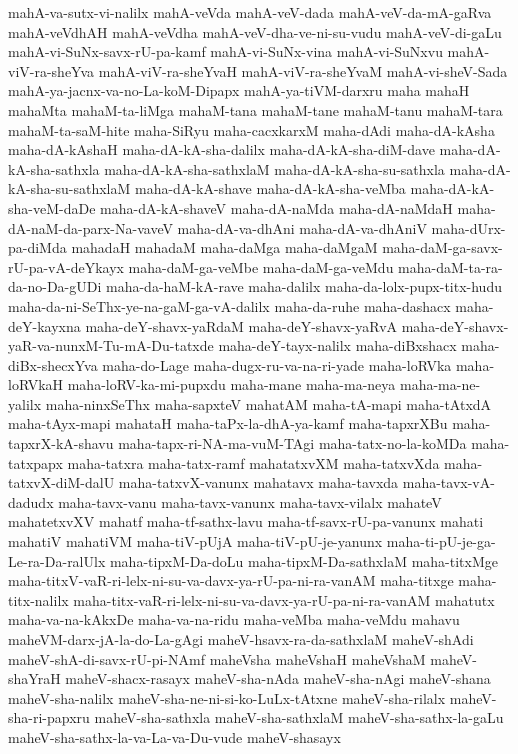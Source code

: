 {mahA-va-sutx-vi-nalilx
mahA-veVda
mahA-veV-dada
mahA-veV-da-mA-gaRva
mahA-veVdhAH
mahA-veVdha
mahA-veV-dha-ve-ni-su-vudu
mahA-veV-di-gaLu
mahA-vi-SuNx-savx-rU-pa-kamf
mahA-vi-SuNx-vina
mahA-vi-SuNxvu
mahA-viV-ra-sheYva
mahA-viV-ra-sheYvaH
mahA-viV-ra-sheYvaM
mahA-vi-sheV-Sada
mahA-ya-jacnx-va-no-La-koM-Dipapx
mahA-ya-tiVM-darxru
maha
mahaH
mahaMta
mahaM-ta-liMga
mahaM-tana
mahaM-tane
mahaM-tanu
mahaM-tara
mahaM-ta-saM-hite
maha-SiRyu
maha-cacxkarxM
maha-dAdi
maha-dA-kAsha
maha-dA-kAshaH
maha-dA-kA-sha-dalilx
maha-dA-kA-sha-diM-dave
maha-dA-kA-sha-sathxla
maha-dA-kA-sha-sathxlaM
maha-dA-kA-sha-su-sathxla
maha-dA-kA-sha-su-sathxlaM
maha-dA-kA-shave
maha-dA-kA-sha-veMba
maha-dA-kA-sha-veM-daDe
maha-dA-kA-shaveV
maha-dA-naMda
maha-dA-naMdaH
maha-dA-naM-da-parx-Na-vaveV
maha-dA-va-dhAni
maha-dA-va-dhAniV
maha-dUrx-pa-diMda
mahadaH
mahadaM
maha-daMga
maha-daMgaM
maha-daM-ga-savx-rU-pa-vA-deYkayx
maha-daM-ga-veMbe
maha-daM-ga-veMdu
maha-daM-ta-ra-da-no-Da-gUDi
maha-da-haM-kA-rave
maha-dalilx
maha-da-lolx-pupx-titx-hudu
maha-da-ni-SeThx-ye-na-gaM-ga-vA-dalilx
maha-da-ruhe
maha-dashacx
maha-deY-kayxna
maha-deY-shavx-yaRdaM
maha-deY-shavx-yaRvA
maha-deY-shavx-yaR-va-nunxM-Tu-mA-Du-tatxde
maha-deY-tayx-nalilx
maha-diBxshacx
maha-diBx-shecxYva
maha-do-Lage
maha-dugx-ru-va-na-ri-yade
maha-loRVka
maha-loRVkaH
maha-loRV-ka-mi-pupxdu
maha-mane
maha-ma-neya
maha-ma-ne-yalilx
maha-ninxSeThx
maha-sapxteV
mahatAM
maha-tA-mapi
maha-tAtxdA
maha-tAyx-mapi
mahataH
maha-taPx-la-dhA-ya-kamf
maha-tapxrXBu
maha-tapxrX-kA-shavu
maha-tapx-ri-NA-ma-vuM-TAgi
maha-tatx-no-la-koMDa
maha-tatxpapx
maha-tatxra
maha-tatx-ramf
mahatatxvXM
maha-tatxvXda
maha-tatxvX-diM-dalU
maha-tatxvX-vanunx
mahatavx
maha-tavxda
maha-tavx-vA-dadudx
maha-tavx-vanu
maha-tavx-vanunx
maha-tavx-vilalx
mahateV
mahatetxvXV
mahatf
maha-tf-sathx-lavu
maha-tf-savx-rU-pa-vanunx
mahati
mahatiV
mahatiVM
maha-tiV-pUjA
maha-tiV-pU-je-yanunx
maha-ti-pU-je-ga-Le-ra-Da-ralUlx
maha-tipxM-Da-doLu
maha-tipxM-Da-sathxlaM
maha-titxMge
maha-titxV-vaR-ri-lelx-ni-su-va-davx-ya-rU-pa-ni-ra-vanAM
maha-titxge
maha-titx-nalilx
maha-titx-vaR-ri-lelx-ni-su-va-davx-ya-rU-pa-ni-ra-vanAM
mahatutx
maha-va-na-kAkxDe
maha-va-na-ridu
maha-veMba
maha-veMdu
mahavu
maheVM-darx-jA-la-do-La-gAgi
maheV-hsavx-ra-da-sathxlaM
maheV-shAdi
maheV-shA-di-savx-rU-pi-NAmf
maheVsha
maheVshaH
maheVshaM
maheV-shaYraH
maheV-shacx-rasayx
maheV-sha-nAda
maheV-sha-nAgi
maheV-shana
maheV-sha-nalilx
maheV-sha-ne-ni-si-ko-LuLx-tAtxne
maheV-sha-rilalx
maheV-sha-ri-papxru
maheV-sha-sathxla
maheV-sha-sathxlaM
maheV-sha-sathx-la-gaLu
maheV-sha-sathx-la-va-La-va-Du-vude
maheV-shasayx
}
